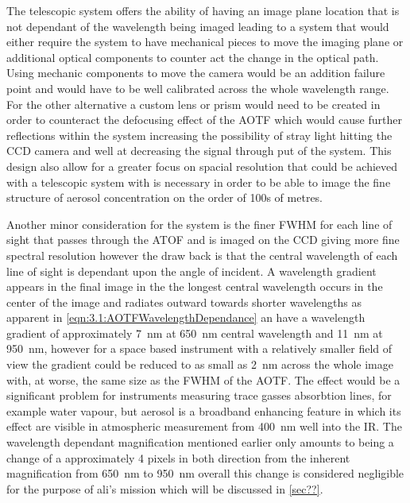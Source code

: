 \documentclass[12pt, draft]{article}
\begin{document}
The telescopic system offers the ability of having an image plane location that is not dependant of the wavelength being imaged leading to a system that would either require the system to have mechanical pieces to move the imaging plane or additional optical components to counter act the change in the optical path. Using mechanic components to move the camera would be an addition failure point and would have to be well calibrated across the whole wavelength range. For the other alternative a custom lens or prism would need to be created in order to counteract the defocusing effect of the AOTF which would cause further reflections within the system increasing the possibility of stray light hitting the CCD camera and well at decreasing the signal through put of the system. This design also allow for a greater focus on spacial resolution that could be achieved with a telescopic system with is necessary in order to be able to image the fine structure of aerosol concentration on the order of 100s of metres.

Another minor consideration for the system is the finer FWHM for each line of sight that passes through the ATOF and is imaged on the CCD giving more fine spectral resolution however the draw back is that the central wavelength of each line of sight is dependant upon the angle of incident. A wavelength gradient appears in the final image in the the longest central wavelength occurs in the center of the image and radiates outward towards shorter wavelengths as apparent in \autoref{eqn:3.1:AOTFWavelengthDependance} an have a wavelength gradient of approximately 7~nm at 650~nm central wavelength and 11~nm at 950~nm, however for a space based instrument with a relatively smaller field of view the gradient could be reduced to as small as 2~nm across the whole image with, at worse, the same size as the FWHM of the AOTF. The effect would be a significant problem for instruments measuring trace gasses absorbtion lines, for example water vapour, but aerosol is a broadband enhancing feature in which its effect are visible in atmospheric measurement from 400~nm well into the IR. The wavelength dependant magnification mentioned earlier only amounts to being a change of a approximately 4 pixels in both direction from the inherent magnification from 650~nm to 950~nm overall this change is considered negligible for the purpose of ali's mission which will be discussed in \autoref{sec??}.
\end{document}
